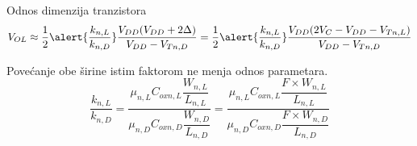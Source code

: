 \begin{frame}[label=09_1-s047]{Odnos dimenzija tranzistora}\setlength{\parskip}{2pt}\setlength{\abovedisplayskip}{4pt}\setlength{\belowdisplayskip}{4pt}\setlength{\abovedisplayshortskip}{3pt}\setlength{\belowdisplayshortskip}{3pt}
\[V_{OL}\approx\frac12\alert{\frac{k_{n,L}}{k_{n,D}}}\frac{V_{DD}(V_{DD}+2\Delta)}{V_{DD}-V_{Tn,D}}=\frac12\alert{\frac{k_{n,L}}{k_{n,D}}}\frac{V_{DD}(2V_C-V_{DD}-V_{Tn,L})}{V_{DD}-V_{Tn,D}}\]
\medskip\par\alert{Povećanje obe širine istim faktorom ne menja odnos parametara.}\[\frac{k_{n,L}}{k_{n,D}}=\frac{\mu_{n,L}C_{oxn,L}\dfrac{W_{n,L}}{L_{n,L}}}{\mu_{n,D}C_{oxn,D}\dfrac{W_{n,D}}{L_{n,D}}}=\frac{\mu_{n,L}C_{oxn,L}\dfrac{F\times W_{n,L}}{L_{n,L}}}{\mu_{n,D}C_{oxn,D}\dfrac{F\times W_{n,D}}{L_{n,D}}}\]

\end{frame}

